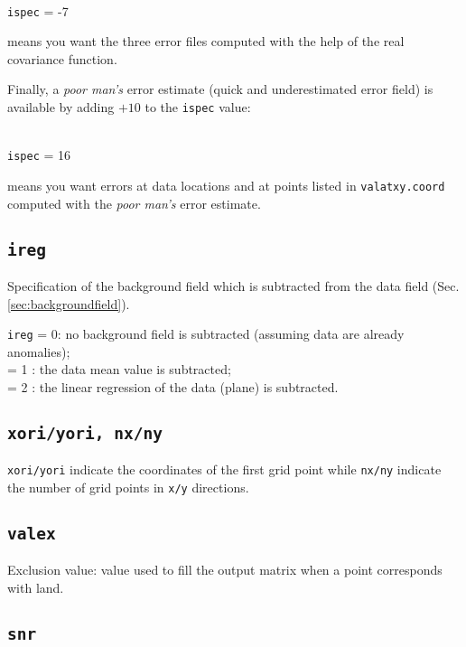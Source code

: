 \example\\
\texttt{ispec}             = -7 \qquad \begin{minipage}[t]{.7\textwidth}{means you want the three error files computed with the help of the real covariance function.}\end{minipage}


Finally, a \textit{poor man's} error estimate (quick and underestimated error field) is available by adding $+10$ to the \texttt{ispec} value:

\example\\
\texttt{ispec}             = 16 \qquad \begin{minipage}[t]{.7\textwidth}{means you want errors at data locations and at points listed in \texttt{valatxy.coord} computed with the \textit{poor man's} error estimate.}\end{minipage}


\subsection{\texttt{ireg}}

Specification of the background field which is subtracted from the data field (Sec. \ref{sec:backgroundfield}).

\texttt{ireg}             = 0\qquad: no background field is subtracted (assuming data are already anomalies); \\
  = 1 \qquad: the data mean value is subtracted;\\
  = 2 \qquad: the linear regression of the data (plane) is subtracted.

\subsection{\texttt{xori/yori, nx/ny}}

\texttt{xori/yori} indicate the coordinates of the first grid point while \texttt{nx/ny} indicate the number of grid points in \texttt{x/y} directions.



\subsection{\texttt{valex}}

Exclusion value: value used to fill the output matrix when a point corresponds with land.


\subsection{\texttt{snr}}

